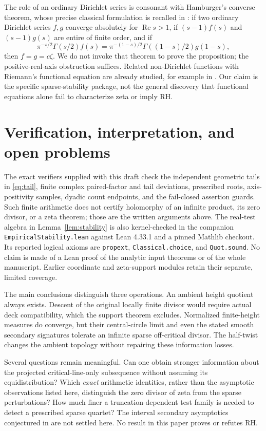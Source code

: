 \documentclass[11pt,a4paper]{article}
\theoremstyle{definition}
\theoremstyle{remark}
\DeclareMathOperator{\Rea}{Re}
\begin{document}
The role of an ordinary Dirichlet series is consonant with Hamburger's
converse theorem, whose precise classical formulation is recalled in
\cite[Introduction]{KMP}: if two ordinary Dirichlet series $f,g$ converge
absolutely for $\Rea s>1$, if $(s-1)f(s)$ and $(s-1)g(s)$ are entire of
finite order, and if
\[
 \pi^{-s/2}\Gamma(s/2)f(s)
 =\pi^{-(1-s)/2}\Gamma((1-s)/2)g(1-s),
\]
then $f=g=c\zeta$. We do not invoke that theorem to prove the proposition; the
positive-real-axis obstruction suffices. Related non-Dirichlet functions
with Riemann's functional equation are already studied, for example in
\cite{Nakamura}. Our claim is the specific sparse-stability package, not
the general discovery that functional equations alone fail to characterize
zeta or imply RH.

\section{Verification, interpretation, and open problems}

The exact verifiers supplied with this draft check the independent geometric
tails in \eqref{eq:tail}, finite complex paired-factor and tail deviations,
prescribed roots, axis-positivity samples, dyadic count endpoints, and the
fail-closed assertion guards. Such finite arithmetic does not certify holomorphy of an
infinite product, its zero divisor, or a zeta theorem; those are the written
arguments above. The real-test algebra in Lemma~\ref{lem:stability} is
also kernel-checked in the companion \texttt{EmpiricalStability.lean} against
Lean 4.33.1 and a pinned Mathlib checkout. Its reported logical axioms are
\texttt{propext}, \texttt{Classical.choice}, and \texttt{Quot.sound}.
No claim is made of a Lean proof of the analytic input theorems or of the
whole manuscript. Earlier coordinate and zeta-support modules retain their
separate, limited coverage.

The main conclusions distinguish three operations. An ambient height
quotient always exists. Descent of the original locally finite divisor
would require actual deck compatibility, which the support theorem excludes.
Normalized finite-height measures do converge, but their central-circle
limit and even the stated smooth secondary signatures tolerate an infinite
sparse off-critical divisor. The half-twist changes the ambient topology
without repairing these information losses.

Several questions remain meaningful. Can one obtain stronger information
about the projected critical-line-only subsequence without assuming its
equidistribution? Which \emph{exact} arithmetic identities, rather than the
asymptotic observations listed here, distinguish the zero divisor of zeta
from the sparse perturbations? How much finer a truncation-dependent test
family is needed to detect a prescribed sparse quartet? The interval
secondary asymptotics conjectured in \cite{FZ,FSZ} are not settled here.
No result in this paper proves or refutes RH.
\end{document}
